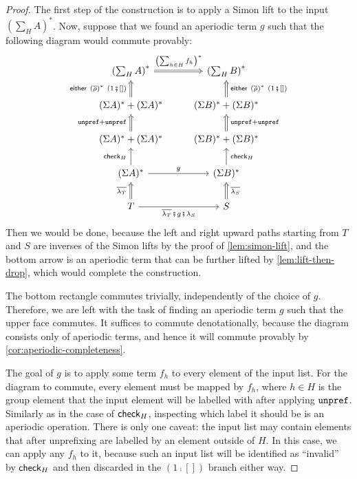 \begin{proof}
    The first step of the construction is to apply a Simon lift to the input  $(\sum_H A)^*$. Now, suppose that we found an aperiodic term $g$ such that the following diagram would commute provably:
    \[
    \begin{tikzcd}
        \left( \sum_H A \right)^* 
        \ar[r, \dropar, "{\left( \sum_{h \in H} f_h \right)^*}"{yshift=0.5ex}]
        &\left( \sum_H B \right)^*
        \\ 
        (\Sigma A)^* + (\Sigma A)^*
        \ar[u, \dropar, "{\either{\left( \inv \rho \right)^*}{(1 \comp [])}}"{xshift=-0.5ex}]
        &(\Sigma B)^* + (\Sigma B)^*
        \ar[u, \dropar, "{\either{\left( \inv \rho \right)^*}{(1 \comp [])}}"'{xshift=0.5ex}]
        \\ 
        (\Sigma A)^* + (\Sigma A)^*
        \ar[u, \dropar, "\unprefterm + \unprefterm"{xshift=-0.5ex}]
        &(\Sigma B)^* + (\Sigma B)^*
        \ar[u, \dropar, "\unprefterm + \unprefterm"'{xshift=0.5ex}]
        \\ 
        (\Sigma A)^* 
        \ar[u, "\checkterm_H"{xshift=-0.5ex}]
        \ar[r, "g"]
        &(\Sigma B)^* 
        \ar[u, "\checkterm_H"'{xshift=0.5ex}]
        \\ 
        T 
        \ar[u, \dropar, "\inv{\lambda_T}"{xshift=-0.5ex}]
        \ar[r, "{\inv{\lambda_T} \comp g \comp \lambda_S}"']
        &S 
        \ar[u, \dropar, "\inv{\lambda_S}"'{xshift=0.5ex}]
    \end{tikzcd}
    \]
    Then we would be done, because the left and right upward paths starting from $T$ and $S$ are inverses of the Simon lifts by the proof of \cref{lem:simon-lift}, and the bottom arrow is an aperiodic term that can be further lifted by \cref{lem:lift-then-drop}, which would complete the construction.

    The bottom rectangle commutes trivially, independently of the choice of $g$. Therefore, we are left with the task of finding an aperiodic term $g$ such that the upper face commutes. It suffices to commute denotationally, because the diagram consists only of aperiodic terms, and hence it will commute provably by \cref{cor:aperiodic-completeness}.

    The goal of $g$ is to apply some term $f_h$ to every element of the input list. For the diagram to commute, every element must be mapped by $f_h$, where $h \in H$ is the group element that the input element will be labelled with after applying $\mathtt{unpref}$. Similarly as in the case of $\mathsf{check}_H$, inspecting which label it should be is an aperiodic operation. There is only one caveat: the input list may contain elements that after unprefixing are labelled by an element outside of $H$. In this case, we can apply any $f_h$ to it, because such an input list will be identified as ``invalid'' by $\mathsf{check}_H$ and then discarded in the $(1\comp[])$ branch either way.
\end{proof}

